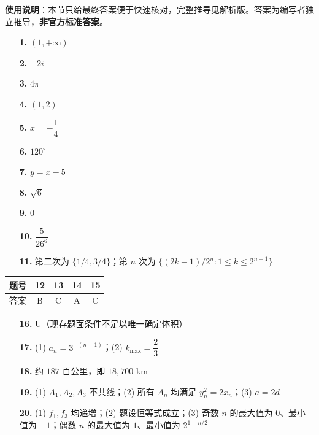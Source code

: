 
\begin{gknotice}
\textbf{使用说明}：本节只给最终答案便于快速核对，完整推导见解析版。答案为编写者独立推导，\textbf{非官方标准答案}。
\end{gknotice}

\begin{itemize}[leftmargin=2.6em]
  \item[\textbf{1.}] $(1,+\infty)$
  \item[\textbf{2.}] $-2i$
  \item[\textbf{3.}] $4\pi$
  \item[\textbf{4.}] $(1,2)$
  \item[\textbf{5.}] $x=-\dfrac14$
  \item[\textbf{6.}] $120^\circ$
  \item[\textbf{7.}] $y=x-5$
  \item[\textbf{8.}] $\sqrt6$
  \item[\textbf{9.}] $0$
  \item[\textbf{10.}] $\dfrac{5}{26^6}$
  \item[\textbf{11.}] 第二次为 $\{1/4,3/4\}$；第 $n$ 次为 $\{(2k-1)/2^n:1\le k\le2^{n-1}\}$
\end{itemize}

\begin{center}\begin{tabular}{ccccc}
\toprule
题号 & 12 & 13 & 14 & 15 \\
\midrule
答案 & B & C & A & C \\
\bottomrule
\end{tabular}\end{center}

\begin{itemize}[leftmargin=2.6em]
  \item[\textbf{16.}] U（现存题面条件不足以唯一确定体积）
  \item[\textbf{17.}] (1) $a_n=3^{-(n-1)}$；(2) $k_{\max}=\dfrac23$
  \item[\textbf{18.}] 约 $187$ 百公里，即 $18{,}700$ km
  \item[\textbf{19.}] (1) $A_1,A_2,A_3$ 不共线；(2) 所有 $A_n$ 均满足 $y_n^2=2x_n$；(3) $a=2d$
  \item[\textbf{20.}] (1) $f_1,f_3$ 均递增；(2) 题设恒等式成立；(3) 奇数 $n$ 的最大值为 $0$、最小值为 $-1$；偶数 $n$ 的最大值为 $1$、最小值为 $2^{1-n/2}$
\end{itemize}
